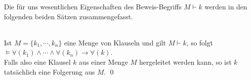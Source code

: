 \noindent
Die für uns wesentlichen Eigenschaften des Beweis-Begriffs $M \vdash k$ werden in den folgenden
beiden Sätzen zusammengefasst.
\begin{Satz}  \hspace*{\fill} \\
    Ist $M = \{k_1,\cdots,k_n\}$ eine Menge von Klauseln und gilt $M \vdash k$, so folgt \\[0.2cm]
    \hspace*{1.3cm} $\models \forall(k_1) \wedge \cdots \wedge \forall(k_n) \rightarrow \forall(k)$. \\[0.2cm]
    Falls also eine Klausel $k$ aus einer Menge $M$ hergeleitet werden kann,
    so ist $k$ tatsächlich eine Folgerung aus $M$. \qed
\end{Satz}

